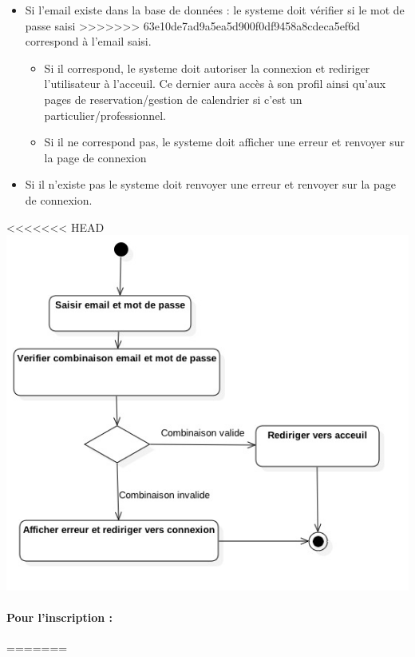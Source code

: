 \documentclass{article}
\begin{document}
\begin{itemize}
\begin{itemize}
\begin{itemize}
\item Si l'email existe dans la base de données :
	le systeme doit vérifier si le mot de passe saisi
>>>>>>> 63e10de7ad9a5ea5d900f0df9458a8cdeca5ef6d
	correspond à l'email saisi.
		\begin{itemize}
		\item Si il correspond, le systeme doit autoriser la connexion et
			rediriger l'utilisateur à l'acceuil. Ce dernier aura accès à son
			profil ainsi qu'aux pages de reservation/gestion de calendrier
			si c'est un particulier/professionnel.
		\item Si il ne correspond pas, le systeme doit afficher une erreur
			et renvoyer sur la page de connexion
		\end{itemize}
\item Si il n'existe pas le systeme doit renvoyer une erreur
	et renvoyer sur la page de connexion.
\end{itemize}

<<<<<<< HEAD
\includegraphics[scale=0.6]{ShematDiagrammes/activiteConnexion.jpg}

\paragraph{Pour l'inscription : }
=======


\end{itemize}
\end{itemize}
\end{document}
